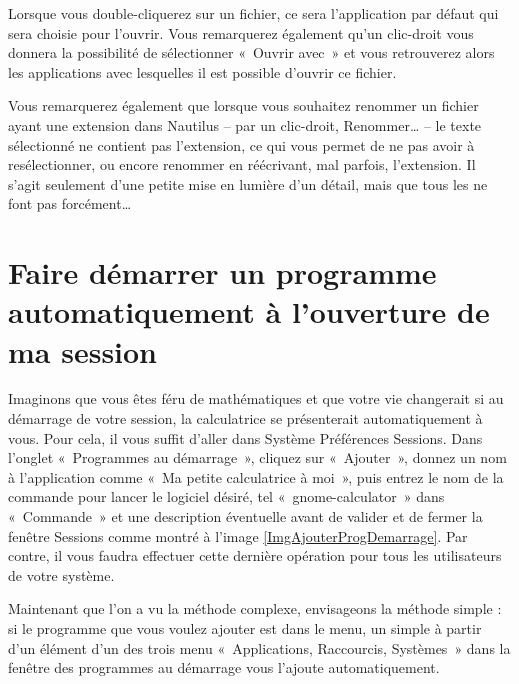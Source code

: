 Lorsque vous double-cliquerez sur un fichier, ce sera l'application par défaut qui sera choisie pour l'ouvrir. Vous remarquerez également qu'un clic-droit vous donnera la possibilité de sélectionner «~Ouvrir avec~» et vous retrouverez alors les applications avec lesquelles il est possible d'ouvrir ce fichier.\par
\begin{nota}
Vous remarquerez également que lorsque vous souhaitez renommer un fichier ayant une extension dans Nautilus -- par un clic-droit, Renommer\ldots{} -- le texte sélectionné ne contient pas l'extension, ce qui vous permet de ne pas avoir à resélectionner, ou encore renommer en réécrivant, mal parfois, l'extension. Il s'agit seulement d'une petite mise en lumière d'un détail, mais que tous les  ne font pas forcément\ldots{}
\end{nota}
\section{Faire démarrer un programme automatiquement à l'ouverture de ma session}
Imaginons que vous êtes féru de mathématiques et que votre vie changerait si au démarrage de votre session, la calculatrice se présenterait automatiquement à vous. Pour cela, il vous suffit d'aller dans Système \FlecheDroite Préférences \FlecheDroite Sessions. Dans l'onglet «~Programmes au démarrage~», cliquez sur «~Ajouter~», donnez un nom à l'application comme «~Ma petite calculatrice à moi~», puis entrez le nom de la commande pour lancer le logiciel désiré, tel «~gnome-calculator~» dans «~Commande~» et une description éventuelle avant de valider et de fermer la fenêtre Sessions comme montré à l'image \ref{ImgAjouterProgDemarrage}. Par contre, il vous faudra effectuer cette dernière opération pour tous les utilisateurs de votre système.\par
{}
Maintenant que l'on a vu la méthode complexe, envisageons la méthode simple : si le programme que vous voulez ajouter est dans le menu, un simple  à partir d'un élément d'un des trois menu «~Applications, Raccourcis, Systèmes~» dans la fenêtre des programmes au démarrage vous l'ajoute automatiquement.
